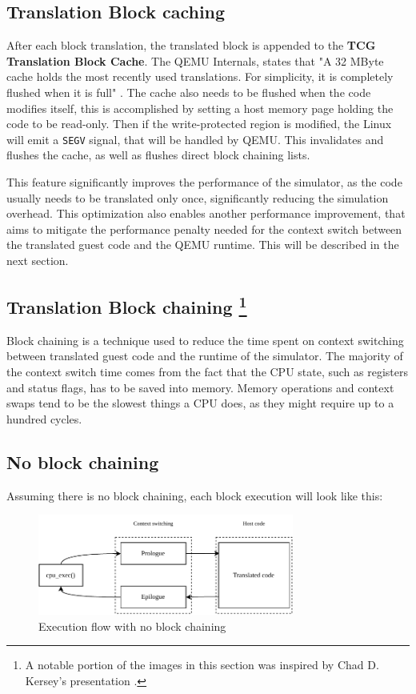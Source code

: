 \subsection{Translation Block caching}

After each block translation, the translated block is appended to the \textbf{TCG Translation Block Cache}.
The QEMU Internals, states that "A 32 MByte cache holds the most recently used translations. For simplicity, it is
completely flushed when it is full" \cite{QemuInternalsTech}. The cache also needs to be flushed when the code modifies
itself, this is accomplished by setting a host memory page holding the code to be read-only. Then if the
write-protected region is modified, the Linux will emit a \texttt{SEGV} signal, that will be handled by QEMU. This
invalidates and flushes the cache, as well as flushes direct block chaining lists.

This feature significantly improves the performance of the simulator, as the code usually needs to be translated only
once, significantly reducing the simulation overhead. This optimization also enables another performance improvement,
that aims to mitigate the performance penalty needed for the context switch between the translated guest code and the
QEMU runtime. This will be described in the next section.

\pagebreak
\subsection[Translation Block chaining]{Translation Block chaining
\footnote{A notable portion of the images in this section was inspired by Chad D. Kersey's presentation
\cite{QemuInternalsPresentation}.}}

Block chaining is a technique used to reduce the time spent on context switching between translated guest code and the
runtime of the simulator. The majority of the context switch time comes from the fact that the CPU state, such as
registers and status flags, has to be saved into memory. Memory operations and context swaps tend to be
the slowest things a CPU does, as they might require up to a hundred cycles.

\subsection*{No block chaining}

Assuming there is no block chaining, each block execution will look like this:
\begin{figure}[h]
	\centering
	\includegraphics[width=0.75\textwidth]{figures/TbExecution-NoChain.pdf}
	\caption{Execution flow with no block chaining}
\end{figure}

